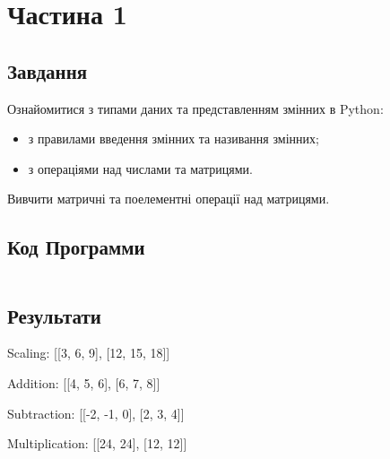 \section{Частина 1}
\label{sec:task1}

\subsection{Завдання}
\label{subsec:task1_task}

Ознайомитися з типами даних та представленням змінних в Python:
\begin{itemize}
    \item
          з правилами введення змінних та називання змінних;

    \item
          з операціями над числами та матрицями.
\end{itemize}
Вивчити матричні та поелементні операції над матрицями.

\subsection{Код Программи}
\label{subsec:task1_code}
\inputminted{python}{../src/task1.py}

\subsection{Результати}
\label{subsec:task1_results}

Scaling:
[[3, 6, 9], [12, 15, 18]]

Addition:
[[4, 5, 6], [6, 7, 8]]

Subtraction:
[[-2, -1, 0], [2, 3, 4]]

Multiplication:
[[24, 24], [12, 12]]
